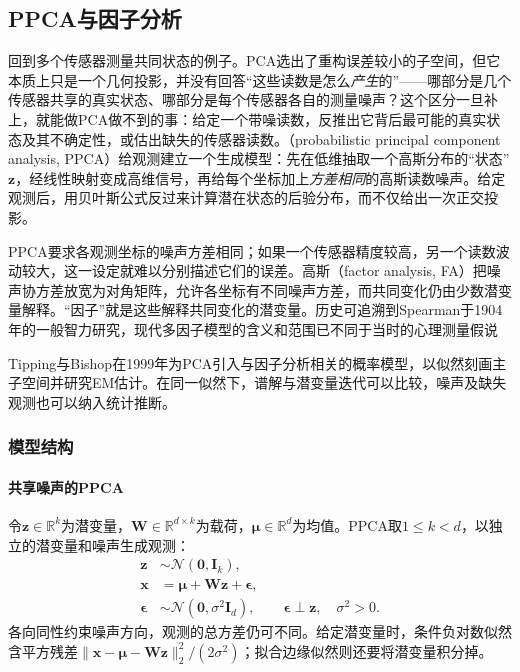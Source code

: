 \subsection{PPCA与因子分析}
\label{sec:dim-ppca}

回到多个传感器测量共同状态的例子。PCA选出了重构误差较小的子空间，但它本质上只是一个几何投影，并没有回答“这些读数是怎么\emph{产生}的”——哪部分是几个传感器共享的真实状态、哪部分是每个传感器各自的测量噪声？这个区分一旦补上，就能做PCA做不到的事：给定一个带噪读数，反推出它背后最可能的真实状态及其不确定性，或估出缺失的传感器读数。（probabilistic principal component analysis, PPCA）给观测建立一个生成模型：先在低维抽取一个高斯分布的“状态”$\bm z$，经线性映射变成高维信号，再给每个坐标加上\emph{方差相同}的高斯读数噪声。给定观测后，用贝叶斯公式反过来计算潜在状态的后验分布，而不仅给出一次正交投影。

PPCA要求各观测坐标的噪声方差相同；如果一个传感器精度较高，另一个读数波动较大，这一设定就难以分别描述它们的误差。高斯（factor analysis, FA）把噪声协方差放宽为对角矩阵，允许各坐标有不同噪声方差，而共同变化仍由少数潜变量解释。“因子”就是这些解释共同变化的潜变量。历史可追溯到Spearman于1904年的一般智力研究，现代多因子模型的含义和范围已不同于当时的心理测量假说

Tipping与Bishop在1999年为PCA引入与因子分析相关的概率模型，以似然刻画主子空间并研究EM估计。在同一似然下，谱解与潜变量迭代可以比较，噪声及缺失观测也可以纳入统计推断。

\subsubsection{模型结构}
\label{sec:dim-ppca-structure}

\paragraph{共享噪声的PPCA}

令$\bm{z}\in\mathbb{R}^k$为潜变量，$\bm{W}\in\mathbb{R}^{d\times k}$为载荷，$\bm{\mu}\in\mathbb{R}^d$为均值。PPCA取$1\leq k<d$，以独立的潜变量和噪声生成观测：
\begin{equation}
\label{eq:dim-ppca-generative}
\begin{aligned}
\bm{z}&\sim\mathcal{N}(\bm{0},\bm{I}_k),\\
\bm{x}&=\bm{\mu}+\bm{W}\bm{z}+\bm{\epsilon},\\
\bm{\epsilon}&\sim\mathcal{N}(\bm{0},\sigma^2\bm{I}_d),
\qquad \bm{\epsilon}\perp\bm{z},\quad \sigma^2>0.
\end{aligned}
\end{equation}
各向同性约束噪声方向，观测的总方差仍可不同。给定潜变量时，条件负对数似然含平方残差$\lVert\bm{x}-\bm{\mu}-\bm{W}\bm{z}\rVert_2^2/(2\sigma^2)$；拟合边缘似然则还要将潜变量积分掉。

